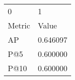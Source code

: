 \begin{tabular}{ll}
0 & 1 \\
Metric & Value \\
AP & 0.646097 \\
P@5 & 0.600000 \\
P@10 & 0.600000 \\
\end{tabular}

